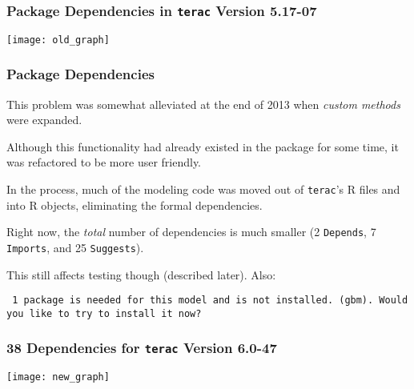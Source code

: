 \documentclass[12 pt]{beamer}\usepackage[]{graphicx}\usepackage[]{color}
\newcommand{\pkg}[1]{{\fontseries{b}\selectfont #1}}
\renewcommand{\pkg}[1]{{\color{darkgreen}\texttt{#1}}}
\begin{document}

  \begin{frame}[fragile]
\frametitle{Package Dependencies in \pkg{terac} Version 5.17-07}
\vspace{-.5in}
  \begin{center}
    \texttt{[image: old\_graph]}
  \end{center}

\end{frame}



\begin{frame}[fragile]
\frametitle{Package Dependencies}

This problem was somewhat alleviated at the end of 2013 when {\em custom methods} were expanded.

\vspace{.1in}

Although this functionality had already existed in the package for some time, it was refactored to be more user friendly.

\vspace{.1in}

In the process, much of the modeling code was moved out of \pkg{terac}'s R files and into R objects, eliminating the formal dependencies.

\vspace{.1in}

Right now, the {\em total} number of dependencies is much smaller (2 \texttt{Depends}, 7 \texttt{Imports}, and 25 \texttt{Suggests}).

\vspace{.1in}

This still affects testing though (described later). Also:

\vspace{.1in}

{\tt \color{darkblue} \footnotesize 1 package is needed for this model and is not installed. (gbm). Would you like to try to install it now?}

\end{frame}



  \begin{frame}[fragile]
\frametitle{38 Dependencies for \pkg{terac} Version 6.0-47 }
\vspace{-.5in}
  \begin{center}
    \texttt{[image: new\_graph]}
  \end{center}

\end{frame}
\end{document}
